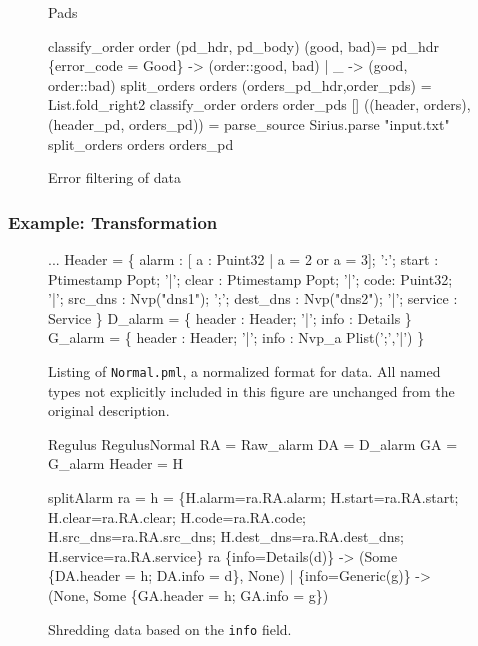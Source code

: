\begin{figure}
\begin{code}\scriptsize
{} Pads

 classify_order order (pd\_hdr, pd\_body) (good, bad)=
    pd\_hdr 
    \{error_code = Good\} -> (order::good, bad)
   | _                  -> (good, order::bad)
 split_orders orders (orders_pd_hdr,order_pds) = 
   List.fold_right2 classify_order orders order_pds []
 ((header, orders),(header_pd, orders_pd)) = 
   parse_source Sirius.parse "input.txt"
split_orders orders orders_pd\end{code} 
\caption{Error filtering of \dibbler{} data}
\label{fig:ex-data-clean}
\end{figure}

\subsubsection{Example: Transformation}
\label{sec:ex-trans}

\begin{figure}
  \centering
  \begin{code}\scriptsize
...
 Header = \{
       alarm : [ a : Puint32 | a = 2 or a = 3];
 ':';  start :  Ptimestamp Popt;
 '|';  clear :  Ptimestamp Popt;
 '|';  code: Puint32;
 '|';  src\_dns  :  Nvp("dns1");
 ';';  dest\_dns :  Nvp("dns2");
 '|';  service  : Service
\}
\mbox{}
 D\_alarm = \{
       header : Header;
 '|';  info   : Details
 \}
\mbox{}
 G\_alarm = \{
       header : Header;
 '|';  info   : Nvp\_a Plist(';','|')
\}\end{code}
\caption{Listing of \texttt{\darkstar{}Normal.pml}, a normalized format for
  \darkstar{} data. All named types not explicitly included in this
  figure are unchanged from the original \darkstar{} description.}
\label{fig:normal-darkstar}
\end{figure}

\begin{figure}
\begin{code}\scriptsize
{} Regulus
 RegulusNormal
 RA = Raw\_alarm
 DA = D\_alarm
 GA = G\_alarm
 Header = H

 splitAlarm ra =
     h = 
       \{H.alarm=ra.RA.alarm; H.start=ra.RA.start; 
        H.clear=ra.RA.clear; H.code=ra.RA.code;
        H.src\_dns=ra.RA.src\_dns; 
        H.dest\_dns=ra.RA.dest\_dns;
        H.service=ra.RA.service\}
      ra 
        \{info=Details(d)\} -> 
        (Some \{DA.header = h; DA.info = d\}, None)
      | \{info=Generic(g)\} ->
        (None, Some \{GA.header = h; GA.info = g\})    
  \end{code}
  \caption{Shredding \darkstar{} data based on the {\tt info} field.}
  \label{fig:ex-no-err-check}
\end{figure}

